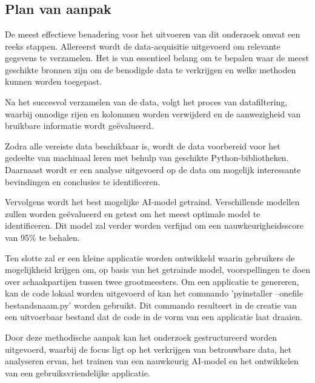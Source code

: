 
\chapter{}
\label{ch:methodologie}

\section{Plan van aanpak}


De meest effectieve benadering voor het uitvoeren van dit onderzoek omvat een reeks stappen. Allereerst wordt de data-acquisitie uitgevoerd om relevante gegevens te verzamelen. Het is van essentieel belang om te bepalen waar de meest geschikte bronnen zijn om de benodigde data te verkrijgen en welke methoden kunnen worden toegepast.

Na het succesvol verzamelen van de data, volgt het proces van datafiltering, waarbij onnodige rijen en kolommen worden verwijderd en de aanwezigheid van bruikbare informatie wordt geëvalueerd.

Zodra alle vereiste data beschikbaar is, wordt de data voorbereid voor het gedeelte van machinaal leren met behulp van geschikte Python-bibliotheken. Daarnaast wordt er een analyse uitgevoerd op de data om mogelijk interessante bevindingen en conclusies te identificeren.

Vervolgens wordt het best mogelijke AI-model getraind. Verschillende modellen zullen worden geëvalueerd en getest om het meest optimale model te identificeren. Dit model zal verder worden verfijnd om een nauwkeurigheidsscore van 95\% te behalen.

Ten slotte zal er een kleine applicatie worden ontwikkeld waarin gebruikers de mogelijkheid krijgen om, op basis van het getrainde model, voorspellingen te doen over schaakpartijen tussen twee grootmeesters. Om een applicatie te genereren, kan de code lokaal worden uitgevoerd of kan het commando 'pyinstaller --onefile bestandsnaam.py' worden gebruikt. Dit commando resulteert in de creatie van een uitvoerbaar bestand dat de code in de vorm van een applicatie laat draaien.

Door deze methodische aanpak kan het onderzoek gestructureerd worden uitgevoerd, waarbij de focus ligt op het verkrijgen van betrouwbare data, het analyseren ervan, het trainen van een nauwkeurig AI-model en het ontwikkelen van een gebruiksvriendelijke applicatie. 

